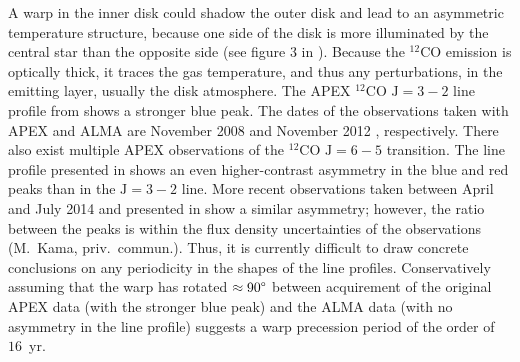 \documentclass[onecolumn]{aastex6}
\begin{document}
% 

A warp in the inner disk  could shadow the outer disk and lead to an asymmetric
temperature structure,  because one side of the disk is more illuminated by the
central star  than the opposite side (see figure 3 in \citealt{panic10}).
Because the $^{12}$CO emission is optically thick, it traces  the gas
temperature, and thus any perturbations, in the emitting layer, usually  the
disk atmosphere.   The APEX $^{12}$CO $\mathrm{J}=3-2$ line profile from
\citet{panic10}  shows a stronger blue peak.   The dates of the observations
taken with  APEX and ALMA are November 2008 \citep[][]{panic10} and November
2012 \citep[][]{walsh14}, respectively.   There also exist multiple APEX
observations of  the $^{12}$CO $\mathrm{J}=6-5$ transition.   The line profile
presented in  \citet{panic10} shows an even higher-contrast asymmetry in the
blue and red  peaks than in the $\mathrm{J}=3-2$ line.   More recent
observations taken between April and July 2014 and presented in \citet{kama16}
show a similar asymmetry; however,  the ratio between the peaks is within the
flux density uncertainties  of the observations (M.~Kama, priv.~commun.). Thus,
it is currently difficult to draw concrete conclusions on any periodicity in the
shapes of the line profiles.    Conservatively assuming that the warp has
rotated $\approx 90\degree$ between  acquirement of the original APEX data (with
the stronger blue peak) and the ALMA data  (with no asymmetry in the line
profile) suggests a warp precession period of the order of $16$~yr.  
\end{document}

